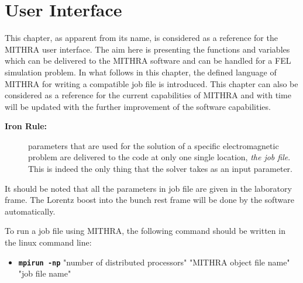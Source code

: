 \chapter{User Interface}
\label{chapter_ui}

This chapter, as apparent from its name, is considered as a reference for the MITHRA user interface.
%
The aim here is presenting the functions and variables which can be delivered to the MITHRA software and can be handled for a FEL simulation problem.
%
In what follows in this chapter, the defined language of MITHRA for writing a compatible job file is introduced.
%
This chapter can also be considered as a reference for the current capabilities of MITHRA and with time will be updated with the further improvement of the software capabilities.
%
\begin{description}
\item[\textbf{Iron Rule:}] parameters that are used for the solution of a specific electromagnetic problem are delivered to the code at only one single location, \emph{the job file}. This is indeed the only thing that the solver takes as an input parameter.
\end{description}
%
It should be noted that all the parameters in job file are given in the laboratory frame.
%
The Lorentz boost into the bunch rest frame will be done by the software automatically.

To run a job file using MITHRA, the following command should be written in the linux command line:

\begin{itemize}
	\item  {\textbf{\texttt{\small mpirun -np}}} "number of distributed processors" "MITHRA object file name" "job file name"
\end{itemize}

